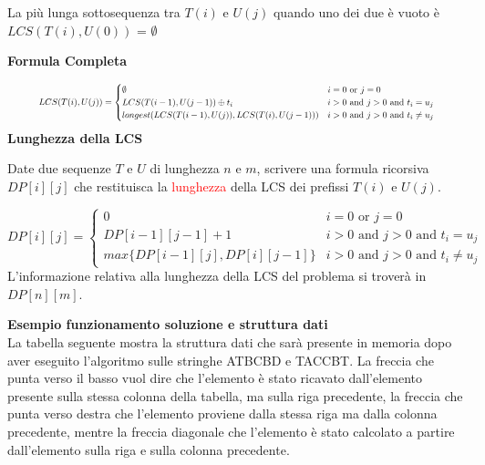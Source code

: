 \documentclass[../cheatSheetAlgoritmi.tex]{subfiles}
\begin{document}
La più lunga sottosequenza tra $T(i)$ e $U(j)$ quando uno dei due è vuoto è $LCS(T(i), U(0))$ = $\emptyset$

\newpage

\textbf{Formula Completa}

\begin{equation*}\resizebox{.9\hsize}{!}{$
  	LCS(T(i), U(j)) =\begin{cases}
    	\emptyset & \text{$i = 0$ or $j=0$}\\
    	LCS(T(i-1), U(j-1)) \oplus t_{i} & \text{$i>0$ and $j>0$ and $t_{i} = u_{j}$}\\
    	longest(LCS(T(i-1), U(j)), LCS(T(i), U(j-1))) & \text{$i>0$ and $j>0$ and $t_{i} \neq u_{j}$}
  	\end{cases}
$}\end{equation*}
\textbf{Lunghezza della LCS}

Date due sequenze $T$ e $U$ di lunghezza $n$ e $m$, scrivere una formula ricorsiva $DP[i][j]$ che restituisca la \textcolor{red}{lunghezza} della LCS dei prefissi $T(i)$ e $U(j)$.

\begin{equation*}
  	DP[i][j] =\begin{cases}
    	0 & \text{$i = 0$ or $j=0$}\\
    	DP[i-1][j-1] + 1 & \text{$i>0$ and $j>0$ and $t_{i} = u_{j}$}\\
    	max \{DP[i-1][j], DP[i][j-1]\} & \text{$i>0$ and $j>0$ and $t_{i} \neq u_{j}$}
    	
  	\end{cases}
\end{equation*}
L'informazione relativa alla lunghezza della LCS del problema si troverà in $DP[n][m]$.

\bigskip

\textbf{Esempio funzionamento soluzione e struttura dati}\\
La tabella seguente mostra la struttura dati che sarà presente in memoria dopo aver eseguito l'algoritmo sulle stringhe ATBCBD e TACCBT. La freccia che punta verso il basso vuol dire che l'elemento è stato ricavato dall'elemento presente sulla stessa colonna della tabella, ma sulla riga precedente, la freccia che punta verso destra che l'elemento proviene dalla stessa riga ma dalla colonna precedente, mentre la freccia diagonale che l'elemento è stato calcolato a partire dall'elemento sulla riga e sulla colonna precedente. 
\end{document}
